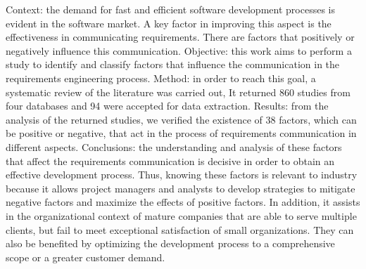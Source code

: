 Context: the demand for fast and efficient software development processes is evident in the software market. A key factor in improving this aspect is the effectiveness in communicating requirements. There are factors that positively or negatively influence this communication. Objective: this work aims to perform a study to identify and classify  factors that influence the communication in the requirements engineering process. Method: in order to reach this goal, a systematic review of the literature was carried out, It returned 860 studies from four databases and 94 were accepted for data extraction. Results: from the analysis of the returned studies, we verified the existence of 38 factors, which can be positive or negative, that act in the process of requirements communication in different aspects. Conclusions: the understanding and analysis of these factors that affect the requirements communication is decisive in order to obtain an effective development process. Thus, knowing these factors is relevant to industry because it allows project managers and analysts to develop strategies to mitigate negative factors and maximize the effects of positive factors. In addition, it assists in the organizational context of mature companies that are able to serve multiple clients, but fail to meet exceptional satisfaction of small organizations. They can also be benefited by optimizing the development process to a comprehensive scope or a greater customer demand.

